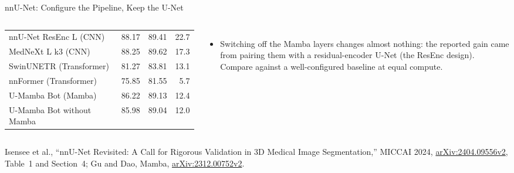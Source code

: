 \begin{frame}{nnU-Net: Configure the Pipeline, Keep the U-Net}
\begin{columns}[T,onlytextwidth]
{\begin{tabular}{l r r r}
        nnU-Net ResEnc L (CNN) & 88.17 & 89.41 & 22.7 \\
        MedNeXt L k3 (CNN) & 88.25 & 89.62 & 17.3 \\
        SwinUNETR (Transformer) & 81.27 & 83.81 & 13.1 \\
        nnFormer (Transformer) & 75.85 & 81.55 & 5.7 \\
        U-Mamba Bot (Mamba) & 86.22 & 89.13 & 12.4 \\
        U-Mamba Bot without Mamba & 85.98 & 89.04 & 12.0 \\
        \bottomrule
      \end{tabular}\par}
      \begin{itemize}\scriptsize\itemsep0.25em
        \item Switching off the Mamba layers changes almost nothing: the reported gain came from pairing them with a residual-encoder U-Net (the ResEnc design). Compare against a well-configured baseline at equal compute.
      \end{itemize}
  \end{columns}
  {\scriptsize Isensee et al., ``nnU-Net Revisited: A Call for Rigorous Validation in 3D Medical Image Segmentation,'' MICCAI 2024, \href{https://arxiv.org/abs/2404.09556v2}{arXiv:2404.09556v2}, Table~1 and Section~4; Gu and Dao, Mamba, \href{https://arxiv.org/abs/2312.00752v2}{arXiv:2312.00752v2}.\par}
\end{frame}

